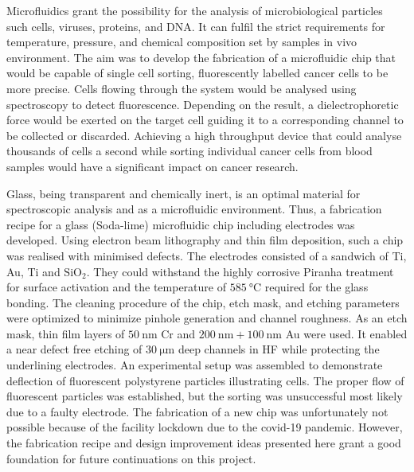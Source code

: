 \documentclass[final]{jyflluk}
\begin{document}
\bigskip
{

\noindent Microfluidics grant the possibility for the analysis of microbiological particles such cells, viruses, proteins, and DNA. It can fulfil the strict requirements for temperature, pressure, and chemical composition set by samples in vivo environment. The aim was to develop the fabrication of a microfluidic chip that would be capable of single cell sorting, fluorescently labelled cancer cells to be more precise. Cells flowing through the system would be analysed using spectroscopy to detect fluorescence. Depending on the result, a dielectrophoretic force would be exerted on the target cell guiding it to a corresponding channel to be collected or discarded. Achieving a high throughput device that could analyse thousands of cells a second while sorting individual cancer cells from blood samples would have a significant impact on cancer research.

Glass, being transparent and chemically inert, is an optimal material for spectroscopic analysis and as a microfluidic environment. Thus, a fabrication recipe for a glass (Soda-lime) microfluidic chip including electrodes was developed. Using electron beam lithography and thin film deposition, such a chip was realised with minimised defects. The electrodes consisted of a sandwich of Ti, Au, Ti and $\mathrm{SiO_2}$. They could withstand the highly corrosive Piranha treatment for surface activation and the temperature of $\SI{585}{\celsius}$ required for the glass bonding. The cleaning procedure of the chip, etch mask, and etching parameters were optimized to minimize pinhole generation and channel roughness. As an etch mask, thin film layers of $\SI{50}{\nano \metre}$ Cr and  $\SI{200}{\nano \metre} + \SI{100}{\nano \metre}$ Au were used. It enabled a near defect free etching of $\SI{30}{\micro \metre}$ deep channels in HF while protecting the underlining electrodes. An experimental setup was assembled to demonstrate deflection of fluorescent polystyrene particles illustrating cells. The proper flow of fluorescent particles was established, but the sorting was unsuccessful most likely due to a faulty electrode. The fabrication of a new chip was unfortunately not possible because of the facility lockdown due to the covid-19 pandemic. However, the fabrication recipe and design improvement ideas presented here grant a good foundation for future continuations on this project.

}


\bigskip
\end{document}
